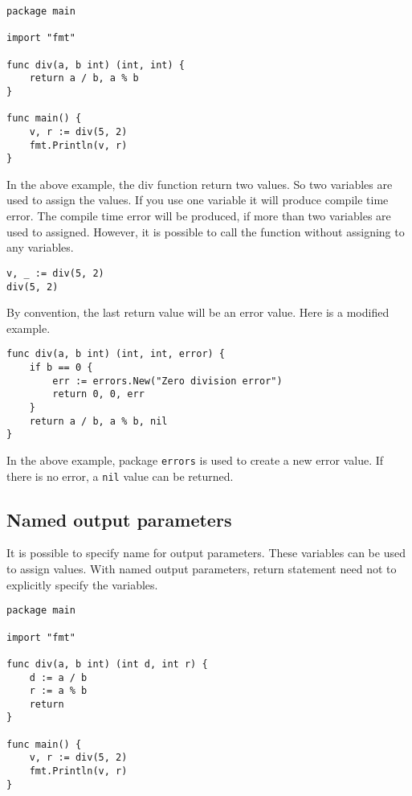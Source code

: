 \begin{lstlisting}[caption=Function with two return values]
package main

import "fmt"

func div(a, b int) (int, int) {
    return a / b, a % b
}

func main() {
    v, r := div(5, 2)
    fmt.Println(v, r)
}
\end{lstlisting}

In the above example, the div function return two values.  So two
variables are used to assign the values.  If you use one variable it
will produce compile time error.  The compile time error will be
produced, if more than two variables are used to assigned.  However,
it is possible to call the function without assigning to any
variables.

\begin{lstlisting}[numbers=none]
v, _ := div(5, 2)
div(5, 2)
\end{lstlisting}

By convention, the last return value will be an error value.  Here is
a modified example.

\begin{lstlisting}[numbers=none]
func div(a, b int) (int, int, error) {
    if b == 0 {
        err := errors.New("Zero division error")
        return 0, 0, err
    }
    return a / b, a % b, nil
}
\end{lstlisting}

In the above example, package \texttt{errors} is used to create a new
error value.  If there is no error, a \texttt{nil} value can be
returned.

\subsection{Named output parameters}

It is possible to specify name for output
parameters.  These variables can be used
to assign values.  With named output parameters, return statement need
not to explicitly specify the variables.

\begin{lstlisting}[caption=Function with named output parameters]
package main

import "fmt"

func div(a, b int) (int d, int r) {
    d := a / b
    r := a % b
    return
}

func main() {
    v, r := div(5, 2)
    fmt.Println(v, r)
}
\end{lstlisting}

